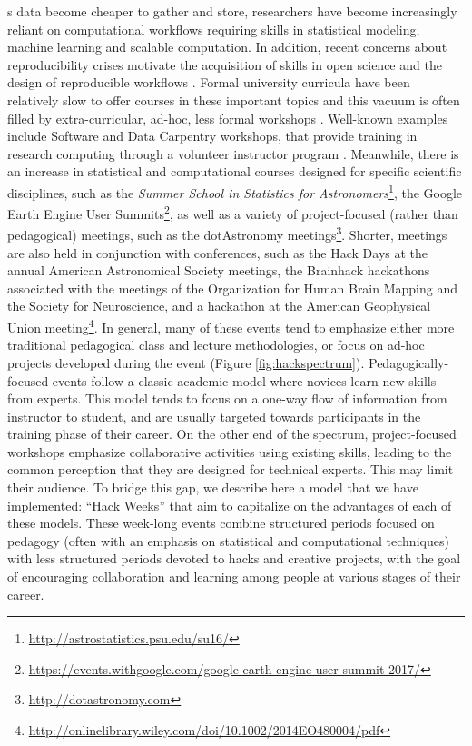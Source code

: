 \label{sec:introduction}
s data become cheaper to gather and store, researchers have become increasingly reliant on computational workflows requiring skills in statistical modeling, machine learning and scalable computation. In addition, recent concerns about reproducibility crises motivate the acquisition of skills in open science and the design of reproducible workflows \cite[e.g.][]{pashler2012,baker2016}.
Formal university curricula have been relatively slow to offer courses in these important topics and this vacuum is often filled by extra-curricular, ad-hoc, less formal workshops \cite{demasi2017}.
Well-known examples include Software and Data Carpentry workshops, that provide training in research computing through a volunteer instructor program \cite{b:wilson-swc-lessons-2016,teal2015data}.
Meanwhile, there is an increase in statistical and computational courses designed for specific scientific disciplines, such as the \textit{Summer School in Statistics for Astronomers}\footnote{\url{http://astrostatistics.psu.edu/su16/}}, the Google Earth Engine User Summits\footnote{\url{https://events.withgoogle.com/google-earth-engine-user-summit-2017/}}, as well as a variety of project-focused (rather than pedagogical) meetings, such as the dotAstronomy meetings\footnote{\url{http://dotastronomy.com}}.
Shorter, meetings are also held in conjunction with conferences, such as the Hack Days at the annual American Astronomical Society meetings, the Brainhack hackathons associated with the meetings of the Organization for Human Brain Mapping and the Society for Neuroscience\cite{Cameron_Craddock2016-wc}, and a hackathon at the American Geophysical Union meeting\footnote{\url{http://onlinelibrary.wiley.com/doi/10.1002/2014EO480004/pdf}}.
In general, many of these events tend to emphasize either more traditional pedagogical class and lecture methodologies, or focus on ad-hoc projects developed during the event (Figure \ref{fig:hackspectrum}).
Pedagogically-focused events follow a classic academic model where novices learn new skills from experts. This model tends to focus on a one-way flow of information from instructor to student, and are usually targeted towards participants in the training phase of their career. On the other end of the spectrum, project-focused workshops emphasize collaborative activities using existing skills, leading to the common perception that they are designed for technical experts. This may limit their audience.
To bridge this gap, we describe here a model that we have implemented: ``Hack Weeks'' that aim to capitalize on the advantages of each of these models.
These week-long events combine structured periods focused on pedagogy (often with an emphasis on statistical and computational techniques) with less structured periods devoted to hacks and creative projects, with the goal of encouraging collaboration and learning among people at various stages of their career.

